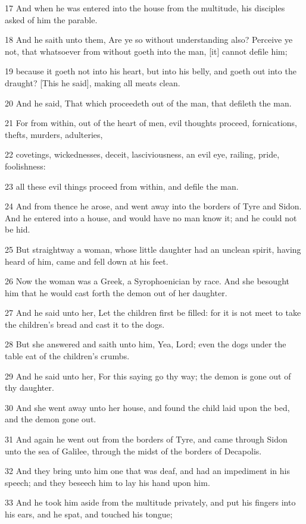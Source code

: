 \par 17 And when he was entered into the house from the multitude, his disciples asked of him the parable.
\par 18 And he saith unto them, Are ye so without understanding also? Perceive ye not, that whatsoever from without goeth into the man, [it] cannot defile him;
\par 19 because it goeth not into his heart, but into his belly, and goeth out into the draught? [This he said], making all meats clean.
\par 20 And he said, That which proceedeth out of the man, that defileth the man.
\par 21 For from within, out of the heart of men, evil thoughts proceed, fornications, thefts, murders, adulteries,
\par 22 covetings, wickednesses, deceit, lasciviousness, an evil eye, railing, pride, foolishness:
\par 23 all these evil things proceed from within, and defile the man.
\par 24 And from thence he arose, and went away into the borders of Tyre and Sidon. And he entered into a house, and would have no man know it; and he could not be hid.
\par 25 But straightway a woman, whose little daughter had an unclean spirit, having heard of him, came and fell down at his feet.
\par 26 Now the woman was a Greek, a Syrophoenician by race. And she besought him that he would cast forth the demon out of her daughter.
\par 27 And he said unto her, Let the children first be filled: for it is not meet to take the children's bread and cast it to the dogs.
\par 28 But she answered and saith unto him, Yea, Lord; even the dogs under the table eat of the children's crumbs.
\par 29 And he said unto her, For this saying go thy way; the demon is gone out of thy daughter.
\par 30 And she went away unto her house, and found the child laid upon the bed, and the demon gone out.
\par 31 And again he went out from the borders of Tyre, and came through Sidon unto the sea of Galilee, through the midst of the borders of Decapolis.
\par 32 And they bring unto him one that was deaf, and had an impediment in his speech; and they beseech him to lay his hand upon him.
\par 33 And he took him aside from the multitude privately, and put his fingers into his ears, and he spat, and touched his tongue;
